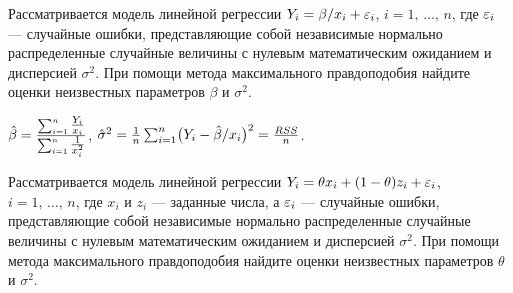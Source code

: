 \begin{problem}
Рассматривается модель линейной регрессии $Y_i = \beta / x_i + \varepsilon_i$, $i = 1, \, \ldots, \, n$, где $\varepsilon_i$ — случайные ошибки, представляющие собой независимые нормально распределенные случайные величины с нулевым математическим ожиданием и дисперсией $\sigma^2$. При помощи метода максимального правдоподобия найдите оценки неизвестных параметров $\beta$ и  $\sigma^2$.

\begin{sol}
$\hat{\beta} = \tfrac{\bigl. \sum_{i=1}^{n}\tfrac{Y_i}{x_i}}{\bigl. \sum_{i=1}^{n}\tfrac{1}{x_i^2}}$, \;\; $\hat{\sigma}^2 = \tfrac{1}{n}\sum_{i=1}^{n}\bigl(Y_i - \hat{\beta} / x_i\bigr)^2 = \tfrac{RSS}{n}$.
\end{sol}
\end{problem}

\begin{problem}
Рассматривается модель линейной регрессии $Y_i = \theta x_i + (1 - \theta) z_i + \varepsilon_i$, $i = 1, \, \ldots, \, n$, где $x_i$ и $z_i$ — заданные числа, а $\varepsilon_i$ — случайные ошибки, представляющие собой независимые нормально распределенные случайные величины с нулевым математическим ожиданием и дисперсией $\sigma^2$. При помощи метода максимального правдоподобия найдите оценки неизвестных параметров $\theta$ и  $\sigma^2$.


\end{problem}
